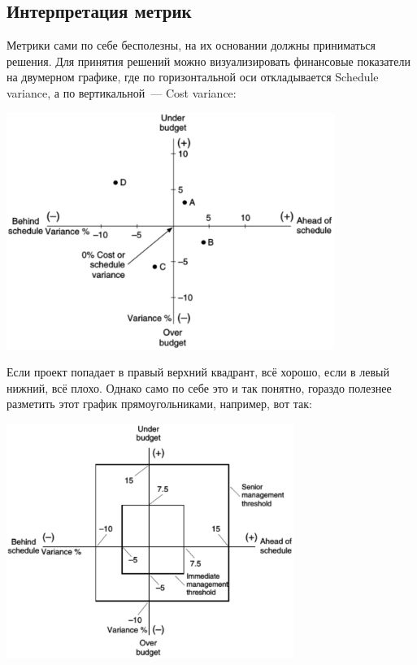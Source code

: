 \documentclass{../../text-style}
\begin{document}
\subsection{Интерпретация метрик}

Метрики сами по себе бесполезны, на их основании должны приниматься решения. Для принятия решений можно визуализировать финансовые показатели на двумерном графике, где по горизонтальной оси откладывается Schedule variance, а по вертикальной~--- Cost variance: 

\begin{center}
    \includegraphics[width=0.8\textwidth]{varianceGraph.png}
\end{center}

Если проект попадает в правый верхний квадрант, всё хорошо, если в левый нижний, всё плохо. Однако само по себе это и так понятно, гораздо полезнее разметить этот график прямоугольниками, например, вот так:

\begin{center}
    \includegraphics[width=0.7\textwidth]{escalationThresholds.png}
\end{center}
\end{document}
